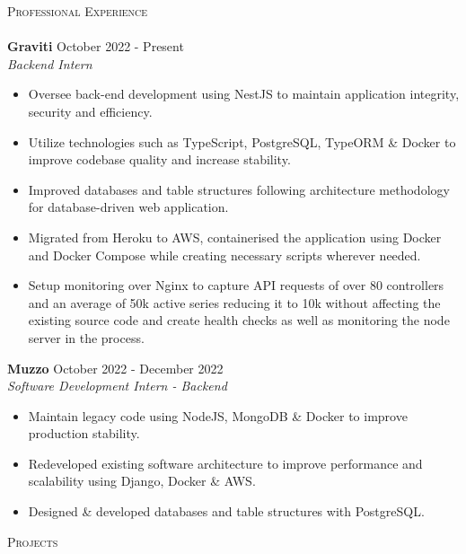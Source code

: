 \documentclass[a4paper]{article}
\newcommand{\lineunder} {
    \vspace*{-8pt} \\
    \hspace*{-18pt} \hrulefill \\
}
\newcommand{\header} [1] {
    {\hspace*{-18pt}\vspace*{6pt} \textsc{#1}}
    \vspace*{-6pt} \lineunder
}
\begin{document}
\vspace{-2mm}
\header{Professional Experience}


{\textbf{Graviti }}\hfill October 2022 - Present \\
 {\textit{Backend Intern }}  \
\vspace{-2.5mm}
\begin{itemize} 
\item Oversee back-end development using NestJS to maintain application integrity, security and efficiency.
\vspace{-2mm}
\item Utilize technologies such as TypeScript, PostgreSQL, TypeORM \& Docker to improve 
codebase quality and increase stability.
\vspace{-2mm}
\item Improved databases and table structures following architecture methodology for database-driven web application.
\vspace{-2mm}
\item Migrated from Heroku to AWS, containerised the application using Docker and Docker Compose while creating necessary scripts wherever needed. 
\vspace{-2mm}
\item Setup monitoring over Nginx to capture API requests of over 80 controllers and an average of 50k active series reducing it to 10k without affecting the existing source code and create health checks as well as monitoring the node server in the process.
\end{itemize}

{\textbf{Muzzo }}\hfill October 2022 - December 2022 \\
 {\textit{Software Development Intern - Backend}}  \
\vspace{-2.5mm}
\begin{itemize} 
\item Maintain legacy code using NodeJS, MongoDB \& Docker to improve production stability. 
\vspace{-2mm}
\item Redeveloped existing software architecture to improve performance and scalability using Django, Docker \& AWS.
\vspace{-2mm}
\item Designed \& developed databases and table structures with PostgreSQL.
\end{itemize}

\header{Projects}
\end{document}
